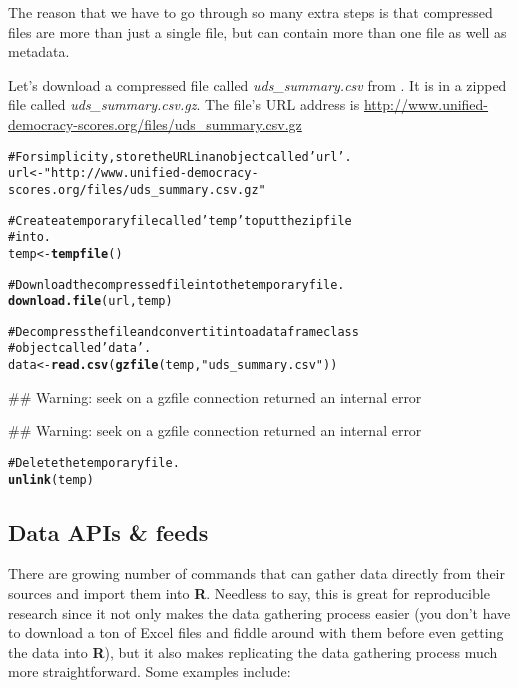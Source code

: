 \documentclass[ChapterTOCs,krantz1]{krantz}\usepackage{graphicx, color}
\makeatletter
\newcommand{\hlfunctioncall}[1]{\textcolor[rgb]{0.501960784313725,0,0.329411764705882}{\textbf{#1}}}%
\newcommand{\hlstring}[1]{\textcolor[rgb]{0.6,0.6,1}{#1}}%
\newcommand{\hlcomment}[1]{\textcolor[rgb]{0.180392156862745,0.6,0.341176470588235}{#1}}%
\newenvironment{kframe}{%
 \def\at@end@of@kframe{}%
 \ifinner\ifhmode%
  \def\at@end@of@kframe{\end{minipage}}%
  \begin{minipage}{\columnwidth}%
 \fi\fi%
 \def\FrameCommand##1{\hskip\@totalleftmargin \hskip-\fboxsep
 \colorbox{shadecolor}{##1}\hskip-\fboxsep
     \hskip-\linewidth \hskip-\@totalleftmargin \hskip\columnwidth}%
 \MakeFramed {\advance\hsize-\width
   \@totalleftmargin\z@ \linewidth\hsize
   \@setminipage}}%
 {\par\unskip\endMakeFramed%
 \at@end@of@kframe}
\newenvironment{knitrout}{}{} %
\makeatother
\begin{document}
The reason that we have to go through so many extra steps is that compressed files are more than just a single file, but can contain more than one file as well as metadata.

Let's download a compressed file called {\emph{uds\_summary.csv}} from \cite{Pemstein2010}. It is in a zipped file called {\emph{uds\_summary.csv.gz}}. The file's URL address is {\url{http://www.unified-democracy-scores.org/files/uds_summary.csv.gz}}

\begin{knitrout}
\color{fgcolor}\begin{kframe}
\begin{alltt}
\hlcomment{# For simplicity, store the URL in an object called \hlstring{'url'}.}
url <- \hlstring{"http://www.unified-democracy-scores.org/files/uds_summary.csv.gz"}

\hlcomment{# Create a temporary file called \hlstring{'temp'} to put the zip file}
\hlcomment{# into.}
temp <- \hlfunctioncall{tempfile}()

\hlcomment{# Download the compressed file into the temporary file.}
\hlfunctioncall{download.file}(url, temp)

\hlcomment{# Decompress the file and convert it into a dataframe class}
\hlcomment{# object called \hlstring{'data'}.}
data <- \hlfunctioncall{read.csv}(\hlfunctioncall{gzfile}(temp, \hlstring{"uds_summary.csv"}))
\end{alltt}


{\ttfamily\noindent\textcolor{warningcolor}{\#\# Warning: seek on a gzfile connection returned an internal error}}

{\ttfamily\noindent\textcolor{warningcolor}{\#\# Warning: seek on a gzfile connection returned an internal error}}\begin{alltt}

\hlcomment{# Delete the temporary file.}
\hlfunctioncall{unlink}(temp)
\end{alltt}
\end{kframe}
\end{knitrout}


\subsection{Data APIs \& feeds}

There are growing number of commands that can gather data directly from
their sources and import them into \textbf{R}. Needless to say, this is
great for reproducible research since it not only makes the data
gathering process easier (you don't have to download a ton of Excel
files and fiddle around with them before even getting the data into
\textbf{R}), but it also makes replicating the data gathering process
much more straightforward. Some examples include:
\end{document}
